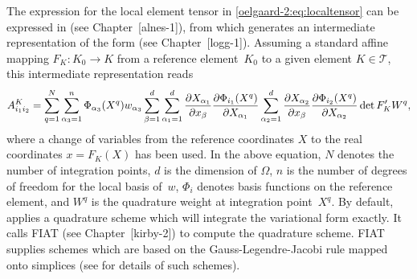 The expression for the local element tensor in
\eqref{oelgaard-2:eq:localtensor} can be expressed in \ufl{}
(see Chapter~[alnes-1]), from which \ffc{} generates an intermediate
representation of the form (see Chapter~[logg-1]).
Assuming a standard affine mapping $F_K : K_0 \rightarrow K$ from a reference
element~$K_{0}$ to a given element $K \in \mathcal{T}$, this intermediate
representation reads
%
\begin{equation}
\small
  A^K_{i_{1} i_{2}}
  =
  \sum_{q=1}^{N}
%
  \sum_{\alpha_{3}=1}^n
  \Phi_{\alpha_{3}}(X^q)
  w_{\alpha_{3}}
%
  \sum_{\beta=1}^d
  \sum_{\alpha_1=1}^d
  \frac{\partial X_{\alpha_1}}{\partial x_{\beta}}
  \frac{\partial \Phi_{i_1}(X^q)}{\partial X_{\alpha_1}}
  \sum_{\alpha_2=1}^d
  \frac{\partial X_{\alpha_2}}{\partial x_{\beta}}
  \frac{\partial \Phi_{i_2}(X^q)}{\partial X_{\alpha_2}}
  \det F_K'
  W^q,
\label{oelgaard-2:eq:weightedlaplacian_quadraturerepresentation}
\end{equation}
%
where a change of variables from the reference coordinates $X$ to the real
coordinates $x = F_K(X)$ has been used. In the above equation, $N$ denotes the
number of integration points, $d$ is the dimension of $\Omega$, $n$
is the number of degrees of freedom for the local basis of~$w$, $\Phi_{i}$
denotes basis functions on the reference element, and $W^q$ is the quadrature
weight at integration point~$X^q$.
By default, \ffc{} applies a quadrature scheme which will integrate the
variational form exactly.
It calls FIAT (see Chapter~[kirby-2]) to compute the quadrature scheme.
FIAT supplies schemes which are based on the Gauss-Legendre-Jacobi rule
mapped onto simplices (see \citet{KarniadakisSherwin2005} for details of such schemes).

